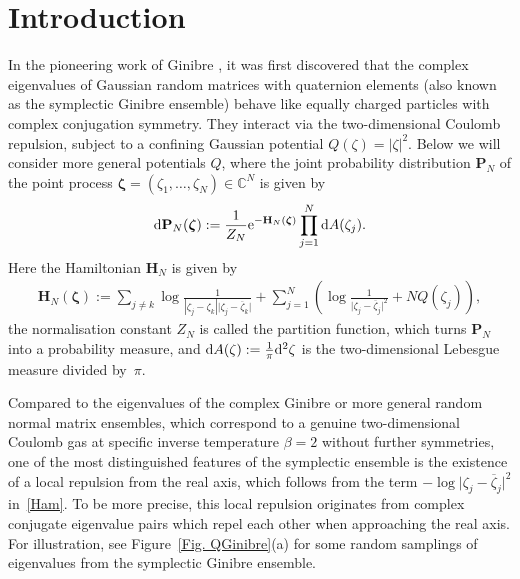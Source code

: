 \documentclass[pdftex]{sigma}
\numberwithin{equation}{section}
\newcommand{\bfH}{{\mathbf H}}
\newcommand{\C}{{\mathbb C}}
\newcommand{\Prob}{{\mathbf{P}}}
\newcommand{\1}{\chi}
\begin{document}


\section{Introduction}

In the pioneering work of Ginibre \cite{ginibre1965statistical}, it was first discovered that the complex eigenvalues of Gaussian random matrices with quaternion elements (also known as the symplectic Ginibre ensemble) behave like equally charged particles with complex conjugation symmetry. They interact via the two-dimensional Coulomb repulsion, subject to a confining
Gaussian potential $Q(\zeta)=|\zeta|^2$.
Below we will consider more general potentials $Q$, where the joint probability distribution $\Prob_N$ of the point process $\boldsymbol{\zeta}=(\zeta_1,\dots,\zeta_N) \in \C^N$ is given by
\begin{gather}\label{Gibbs}
	{\rm d} \Prob _N(\boldsymbol{\zeta}):= \frac{1}{Z_N} {\rm e}^{-\bfH_N( \boldsymbol{\zeta} )} \prod_{j=1}^N {\rm d}A(\zeta_j).
\end{gather}
Here the Hamiltonian $\bfH_N$ is given by
\begin{gather} \label{Ham}
	\bfH_N( \boldsymbol{\zeta} ):=\sum_{j\neq k} \log \frac{1}{|\zeta_j-\zeta_k| \big|\zeta_j-\overline{\zeta}_k\big| }+\sum_{j=1}^{N} \left( \log \frac{1}{\big| \zeta_j- \overline{\zeta}_j \big|^2}+ NQ(\zeta_j) \right),
\end{gather}
the normalisation constant $Z_N$ is called the partition function, which turns $\Prob _N$ into a probability measure, and ${\rm d}A(\zeta):=\tfrac{1}{\pi}{\rm d}^2\zeta$ is the two-dimensional Lebesgue measure divided by~$\pi$.

Compared to the eigenvalues of the complex Ginibre or more general random normal matrix ensembles, which correspond to a genuine two-dimensional Coulomb gas at specific inverse temperature $\beta=2$ without further symmetries, one of the most distinguished features of the symplectic ensemble is the existence of a local repulsion from the real axis, which follows from the term $-\log \big| \zeta_j- \overline{\zeta}_j \big|^2$ in~\eqref{Ham}.
To be more precise, this local repulsion originates from complex conjugate eigenvalue pairs which repel each other when approaching the real axis.
For illustration, see Figure~\ref{Fig. QGinibre}(a) for some random samplings of eigenvalues from the symplectic Ginibre ensemble.
\end{document}
